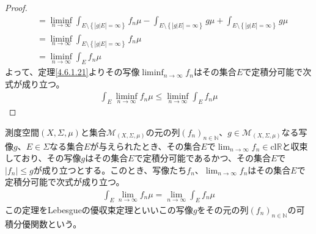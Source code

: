 \documentclass[dvipdfmx]{jsarticle}
\begin{document}
\begin{proof}
\begin{align*}
&= \liminf_{n \rightarrow \infty}{\int_{E \setminus \left\{ \left| g|E \right| = \infty \right\}} {f_{n}\mu}} - \int_{E \setminus \left\{ \left| g|E \right| = \infty \right\}} {g\mu} + \int_{E \setminus \left\{ \left| g|E \right| = \infty \right\}} {g\mu}\\
&= \liminf_{n \rightarrow \infty}{\int_{E \setminus \left\{ \left| g|E \right| = \infty \right\}} {f_{n}\mu}}\\
&= \liminf_{n \rightarrow \infty}{\int_{E} {f_{n}\mu}}
\end{align*}
よって、定理\ref{4.6.1.21}よりその写像$\liminf_{n \rightarrow \infty}f_{n}$はその集合$E$で定積分可能で次式が成り立つ。
\begin{align*}
\int_{E} {\liminf_{n \rightarrow \infty}f_{n}\mu} \leq \liminf_{n \rightarrow \infty}{\int_{E} {f_{n}\mu}}
\end{align*}
\end{proof}
\begin{thm}[Lebesgueの優収束定理]\label{4.6.2.5}
測度空間$(X,\varSigma,\mu)$と集合$\mathcal{M}_{(X,\varSigma,\mu)}$の元の列$\left( f_{n} \right)_{n \in \mathbb{N}}$、$g \in \mathcal{M}_{(X,\varSigma,\mu)}$なる写像$g$、$E \in \varSigma$なる集合$E$が与えられたとき、その集合$E$で$\lim_{n \rightarrow \infty}f_{n} \in \mathrm{cl}\mathbb{R}$と収束しており、その写像$g$はその集合$E$で定積分可能であるかつ、その集合$E$で$\left| f_{n} \right| \leq g$が成り立つとする。このとき、写像たち$f_{n}$、$\lim_{n \rightarrow \infty}f_{n}$はその集合$E$で定積分可能で次式が成り立つ。
\begin{align*}
\int_{E} {\lim_{n \rightarrow \infty}f_{n}\mu} = \lim_{n \rightarrow \infty}{\int_{E} {f_{n}\mu}}
\end{align*}
この定理をLebesgueの優収束定理といいこの写像$g$をその元の列$\left( f_{n} \right)_{n \in \mathbb{N}}$の可積分優関数という。
\end{thm}
\end{document}
